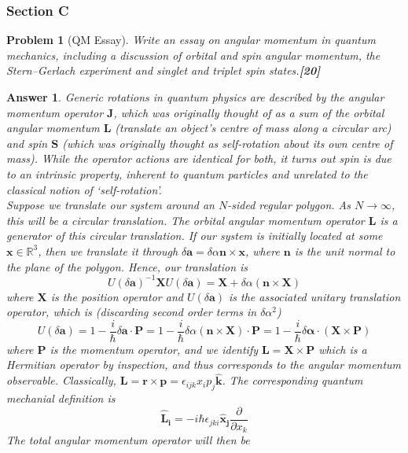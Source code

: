 \documentclass[a4paper]{article}
\newtheorem{ans}{Answer}[subsection]
\theoremstyle{new}
\newtheorem{qns}{Problem}[subsection]
\begin{document}
\subsubsection{Section C}
\begin{qns}[QM Essay]
Write an essay on angular momentum in quantum mechanics, including a discussion of orbital and spin angular momentum, the Stern–Gerlach experiment and singlet and triplet spin states.\hfill\textbf{[20]}
\end{qns}
\begin{ans}
Generic rotations in quantum physics are described by the angular momentum operator $\mathbf{J}$, which was originally thought of as a sum of the orbital angular momentum $\mathbf{L}$ (translate an object's centre of mass along a circular arc) and spin $\mathbf{S}$ (which was originally thought as self-rotation about its own centre of mass). While the operator actions are identical for both, it turns out spin is due to an intrinsic property, inherent to quantum particles and unrelated to the classical notion of `self-rotation'.\\[5pt]
Suppose we translate our system around an $N$-sided regular polygon. As $N\rightarrow\infty$, this will be a circular translation. The orbital angular momentum operator $\mathbf{L}$ is a generator of this circular translation. If our system is initially located at some $\mathbf{x}\in\mathbb{R}^3$, then we translate it through $\delta\mathbf{a}=\delta\alpha\mathbf{n}\times\mathbf{x}$, where $\mathbf{n}$ is the unit normal to the plane of the polygon. Hence, our translation is
$$U(\delta\mathbf{a})^{-1}\mathbf{X}U(\delta\mathbf{a})=\mathbf{X}+\delta\alpha(\mathbf{n}\times\mathbf{X})$$
where $\mathbf{X}$ is the position operator and $U(\delta\mathbf{a})$ is the associated unitary translation operator, which is (discarding second order terms in $\delta\alpha^2$)
$$U(\delta\mathbf{a})=1-\frac{i}{\hbar}\delta\mathbf{a}\cdot\mathbf{P}=1-\frac{i}{\hbar}\delta\alpha(\mathbf{n}\times\mathbf{X})\cdot\mathbf{P}=1-\frac{i}{\hbar}\delta\boldsymbol{\alpha}\cdot(\mathbf{X}\times\mathbf{P})$$
where $\mathbf{P}$ is the momentum operator, and we identify $\mathbf{L}=\mathbf{X}\times\mathbf{P}$ which is a Hermitian operator by inspection, and thus corresponds to the angular momentum observable. Classically,  $\mathbf{L}=\mathbf{r}\times\mathbf{p}=\epsilon_{ijk}x_ip_j\mathbf{\hat{k}}$. The corresponding quantum mechanial definition is
$$\mathbf{\hat{L}_i}=-i\hbar\epsilon_{jki}\mathbf{\hat{x}_j}\frac{\partial}{\partial x_k}$$ 
The total angular momentum operator will then be 

\end{ans}
\end{document}
